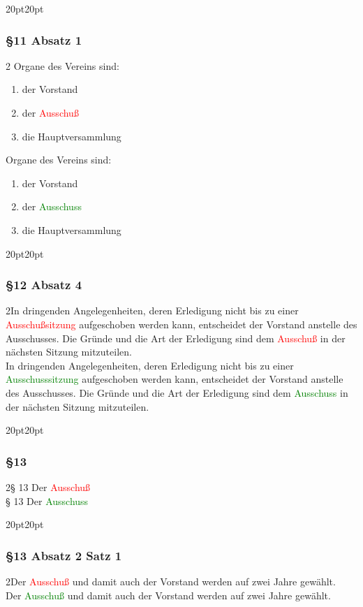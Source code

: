 \documentclass[10pt,a4paper,parskip=half]{scrartcl}
\newcommand{\new}[1]{\textcolor{Green}{#1}}
\newcommand{\old}[1]{\textcolor{Red}{#1}}
\newcommand{\change}[1]{
  \begin{adjustwidth}{20pt}{20pt}
    #1
  \end{adjustwidth}
}
\newcommand{\compare}[3]{\change{\subsubsection*{#1}\begin{multicols}{2}#2\columnbreak\\#3\end{multicols}}}
\begin{document}
  \change{
  \subsubsection*{§11 Absatz 1}\begin{multicols}{2}
    Organe des Vereins sind:
    \begin{enumerate}[noitemsep]
      \item der Vorstand
      \item der \old{Ausschuß}
      \item die Hauptversammlung
    \end{enumerate}
    \columnbreak
    Organe des Vereins sind:
    \begin{enumerate}[noitemsep]
      \item der Vorstand
      \item der \new{Ausschuss}
      \item die Hauptversammlung
    \end{enumerate}
    \end{multicols}
  }

  \compare{§12 Absatz 4}
  {In dringenden Angelegenheiten,
    deren Erledigung nicht bis zu einer \old{Ausschußsitzung} aufgeschoben werden kann,
    entscheidet der Vorstand anstelle des Ausschusses.
    Die Gründe und die Art der Erledigung sind dem \old{Ausschuß} in der nächsten Sitzung mitzuteilen.
  }{
    In dringenden Angelegenheiten,
    deren Erledigung nicht bis zu einer \new{Ausschusssitzung} aufgeschoben werden kann,
    entscheidet der Vorstand anstelle des Ausschusses.
    Die Gründe und die Art der Erledigung sind dem \new{Ausschuss} in der nächsten Sitzung mitzuteilen.
  }

  \compare{§13}
  {§ 13 Der \old{Ausschuß}}
  {§ 13 Der \new{Ausschuss}}


  \compare{§13 Absatz 2 Satz 1}
  {Der \old{Ausschuß} und damit auch der Vorstand werden auf zwei Jahre gewählt.}
  {Der \new{Ausschuß} und damit auch der Vorstand werden auf zwei Jahre gewählt.}
\end{document}
